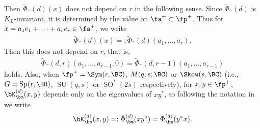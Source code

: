 Then $\tilde{\Phi}_\bm^{(d)}(x)$ does not depend on $r$ in the following sense.
Since $\tilde{\Phi}_\bm^{(d)}$ is $K_L$-invariant, it is determined by the value on $\fa^+\subset\fp^+$.
Thus for $x=a_1e_1+\cdots+a_re_r\in\fa^+$, we write
\begin{gather*} \tilde{\Phi}_\bm^{(d)}(x)=:\tilde{\Phi}_\bm^{(d)}(a_1,\ldots,a_r). \end{gather*}
Then this does not depend on $r$, that is,
\begin{gather*} \tilde{\Phi}_\bm^{(d,r)}(a_1,\ldots,a_{r-1},0)=\tilde{\Phi}_\bm^{(d,r-1)}(a_1,\ldots,a_{r-1}) \end{gather*}
holds. Also, when $\fp^+=\Sym(r,\BC)$, $M(q,s;\BC)$ or $\Skew(s,\BC)$ (i.e., $G=\operatorname{Sp}(r,\BR)$, $\operatorname{SU}(q,s)$ or $\operatorname{SO}^*(2s)$ respectively),
for $x,y\in\fp^+$, $\bK_\bm^{(d)}(x,y)$ depends only on the eigenvalues of $xy^*$, so following the notation in \cite{M} we write
\begin{gather}\label{Phitilde2}
\bK_\bm^{(d)}(x,y)=:\tilde{\Phi}_\bm^{(d)}(xy^*)=\tilde{\Phi}_\bm^{(d)}(y^*x).
\end{gather}


